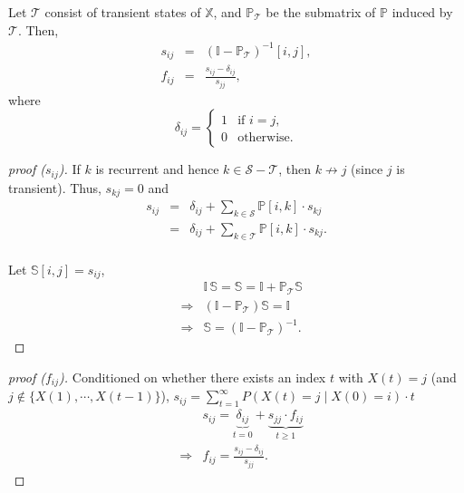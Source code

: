 \begin{theorem}
Let $ \mathcal{T} $ consist of transient states of $ \mathbb{X} $, and $ \mathbb{P}_{\mathcal{T}} $ be the submatrix of $ \mathbb{P} $ induced by $ \mathcal{T} $. Then,
\begin{eqnarray*}
s_{ij} & = & (\mathbb{I} - \mathbb{P}_{\mathcal{T}})^{-1}[i, j], \\
f_{ij} & = & \frac{s_{ij} - \delta_{ij}}{s_{jj}},
\end{eqnarray*}
where
\[ \delta_{ij} = \begin{cases}
  1 & \text{if } i = j, \\
  0 & \text{otherwise}.
\end{cases} \]

\begin{proof}[proof ($ s_{ij} $)]
If $ k $ is recurrent and hence $ k \in \mathcal{S} - \mathcal{T} $, then $ k \not\to j $ (since $ j $ is transient). Thus, $ s_{kj} = 0 $ and
\begin{eqnarray*}
s_{ij}
  & = & \delta_{ij} + \sum_{k \in \mathcal{S}} \mathbb{P}[i, k] \cdot s_{kj} \\
  & = & \delta_{ij} + \sum_{k \in \mathcal{T}} \mathbb{P}[i, k] \cdot s_{kj}. \\
\end{eqnarray*}

Let $ \mathbb{S}[i, j] = s_{ij} $,
\begin{eqnarray*}
  & & \mathbb{I}\,\mathbb{S} = \mathbb{S} = \mathbb{I} + \mathbb{P}_{\mathcal{T}} \mathbb{S} \\
  & \Rightarrow & (\mathbb{I} - \mathbb{P}_{\mathcal{T}})\mathbb{S} = \mathbb{I} \\
  & \Rightarrow & \mathbb{S} = (\mathbb{I} - \mathbb{P}_{\mathcal{T}})^{-1}.
\end{eqnarray*}
\end{proof}

\begin{proof}[proof ($ f_{ij} $)]
Conditioned on whether there exists an index $ t $ with $ X(t) = j $ (and $ j \not\in \{ X(1), \cdots, X(t - 1) \} $),
$ s_{ij} = \sum_{t = 1}^{\infty} P(X(t) = j \mid X(0) = i) \cdot t $
\begin{eqnarray*}
  & & s_{ij} = \underbrace{\delta_{ij}}_{t = 0}  + \underbrace{s_{jj} \cdot f_{ij}}_{t \ge 1} \\
  & \Rightarrow & f_{ij} = \frac{s_{ij} - \delta_{ij}}{s_{jj}}.
\end{eqnarray*}
\end{proof}
\end{theorem}

